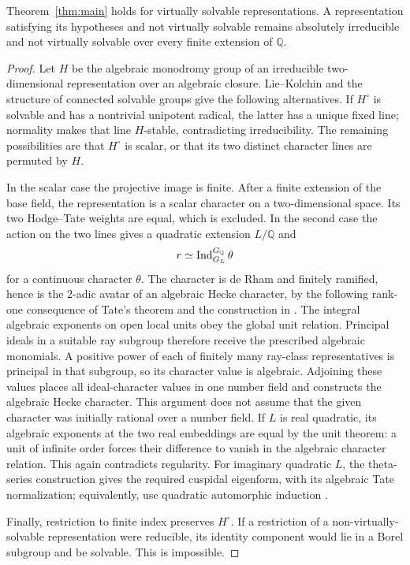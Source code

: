 \begin{lemma}\label{lem:solvable-reduction}
Theorem~\ref{thm:main} holds for virtually solvable
representations. A representation satisfying its hypotheses
and not virtually solvable remains absolutely irreducible
and not virtually solvable over every finite extension of
\(\mathbb Q\).
\end{lemma}
\begin{proof}
Let \(H\) be the algebraic monodromy group of an irreducible
two-dimensional representation over an algebraic closure.
Lie--Kolchin and the structure of connected solvable groups
\cite[Theorems~17.4 and~16.33]{MilneAlgebraicGroups} give the following
alternatives. If \(H^\circ\) is solvable and has a nontrivial unipotent
radical, the latter has a unique fixed line; normality
makes that line \(H\)-stable, contradicting irreducibility.
The remaining possibilities are that \(H^\circ\) is scalar,
or that its two distinct character lines are permuted by
\(H\).

In the scalar case the projective image is finite. After a
finite extension of the base field, the representation is
a scalar character on a two-dimensional space. Its two
Hodge--Tate weights are equal, which is excluded. In the
second case the action on the two lines gives a quadratic
extension \(L/\mathbb Q\) and
\[
 r\simeq\operatorname{Ind}_{G_L}^{G_{\mathbb Q}}\theta
\]
for a continuous character \(\theta\).
The character is de Rham and finitely ramified, hence is the
\(2\)-adic avatar of an algebraic Hecke character, by the
following rank-one consequence of Tate's theorem and the construction
in \cite[Chapter~III, Sections~1.2 and~2.3]{Serre1989Abelian}.
The integral algebraic exponents on open local units obey the global
unit relation. Principal ideals in a suitable ray subgroup therefore
receive the prescribed algebraic monomials. A positive power of each
of finitely many ray-class representatives is principal in that
subgroup, so its character value is algebraic. Adjoining these values
places all ideal-character values in one number field and constructs
the algebraic Hecke character. This argument does not assume that the
given character was initially rational over a number field.
If \(L\)
is real quadratic, its algebraic exponents at the two real
embeddings are equal by the unit theorem: a unit of infinite
order forces their difference to vanish in the algebraic
character relation. This again contradicts regularity.
For imaginary quadratic \(L\), the theta-series construction
gives the required cuspidal eigenform, with its algebraic
Tate normalization; equivalently, use quadratic automorphic
induction \cite[Proposition~12.1]{JacquetLanglands1970}.

Finally, restriction to finite index preserves \(H^\circ\).
If a restriction of a non-virtually-solvable representation
were reducible, its identity component would lie in a
Borel subgroup and be solvable. This is impossible.
\end{proof}

